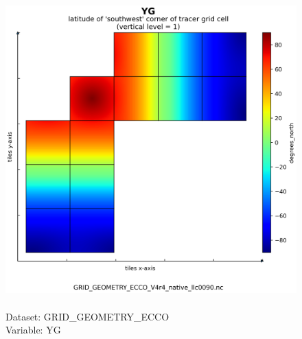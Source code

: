 \begin{figure}[H]
\centering
\includegraphics[scale=0.5]{../images/plots/native_plots_coords/Geometry_Parameters_for_the_Lat-Lon-Cap_90_(llc90)_Native_Model_Grid_(Version_4_Release_4)/YG.png}
\caption{\\Dataset: GRID\_GEOMETRY\_ECCO\\Variable: YG}
\label{tab:table-GRID_GEOMETRY_ECCO_YG-Plot}
\end{figure}
\pagebreak
